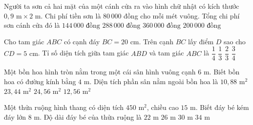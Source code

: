 \begin{ex} %
Người ta sơn cả hai mặt của một cánh cửa ra vào hình chữ nhật có kích thước $0{,}9\text{ m} \times 2\text{ m}$. Chi phí tiền sơn là $80\,000$ đồng cho mỗi mét vuông. Tổng chi phí sơn cánh cửa đó là
\choice
{$144\,000\text{ đồng}$}
{\True $288\,000\text{ đồng}$}
{$360\,000\text{ đồng}$}
{$200\,000\text{ đồng}$}
\end{ex}

\begin{ex} %
Cho tam giác $ABC$ có cạnh đáy $BC = 20\text{ cm}$. Trên cạnh $BC$ lấy điểm $D$ sao cho $CD = 5\text{ cm}$. Tỉ số diện tích giữa tam giác $ABD$ và tam giác $ABC$ là
\choice
{$\dfrac{1}{4}$}
{$\dfrac{1}{3}$}
{$\dfrac{2}{3}$}
{\True $\dfrac{3}{4}$}
\end{ex}

\begin{ex} %
Một bồn hoa hình tròn nằm trong một cái sân hình vuông cạnh $6\text{ m}$. Biết bồn hoa có đường kính bằng $4\text{ m}$. Diện tích phần sân nằm ngoài bồn hoa là
\choice
{$10{,}88\text{ m}^2$}
{\True $23{,}44\text{ m}^2$}
{$24{,}56\text{ m}^2$}
{$12{,}56\text{ m}^2$}
\end{ex}

\begin{ex} %
Một thửa ruộng hình thang có diện tích $450\text{ m}^2$, chiều cao $15\text{ m}$. Biết đáy bé kém đáy lớn $8\text{ m}$. Độ dài đáy bé của thửa ruộng là
\choice
{$22\text{ m}$}
{\True $26\text{ m}$}
{$30\text{ m}$}
{$34\text{ m}$}
\end{ex}

